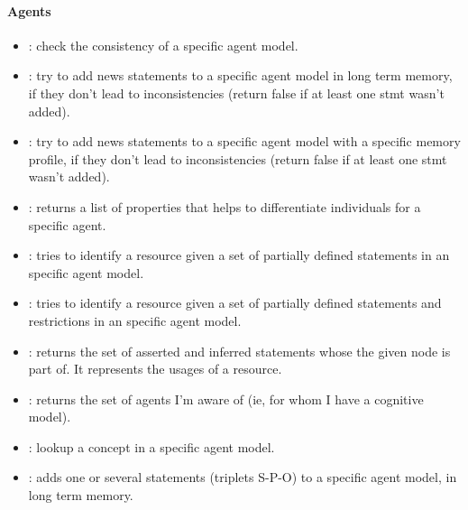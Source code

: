 \paragraph{Agents}
\begin{itemize}

    \item {}: check the consistency
    of a specific agent model.

    \item {}: try to add news statements
    to a specific agent model in long term memory, if they don't lead to
    inconsistencies (return false if at least one stmt wasn't added).

    \item {}: try to add news
    statements to a specific agent model with a specific memory profile, if
    they don't lead to inconsistencies (return false if at least one stmt
    wasn't added).

    \item {}: returns a list of
    properties that helps to differentiate individuals for a specific agent.

    \item {}: tries to identify a
    resource given a set of partially defined statements in an specific agent
    model.

    \item {}: tries to identify
    a resource given a set of partially defined statements and restrictions in
    an specific agent model.

    \item {}: returns the set of
    asserted and inferred statements whose the given node is part of. It
    represents the usages of a resource.

    \item {}: returns the set of agents I'm aware of (ie,
    for whom I have a cognitive model).

    \item {}: lookup a concept in a
    specific agent model.

    \item {}: adds one or several statements
    (triplets S-P-O) to a specific agent model, in long term memory.


\end{itemize}
